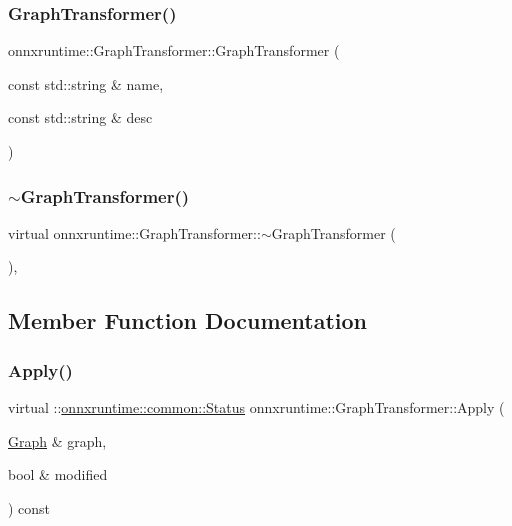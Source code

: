 \subsubsection{\texorpdfstring{Graph\+Transformer()}{GraphTransformer()}}
{\footnotesize\ttfamily onnxruntime\+::\+Graph\+Transformer\+::\+Graph\+Transformer (\begin{DoxyParamCaption}\item[{const std\+::string \&}]{name,  }\item[{const std\+::string \&}]{desc }\end{DoxyParamCaption})\hspace{0.3cm}{\ttfamily [inline]}}

\mbox{\label{classonnxruntime_1_1GraphTransformer_a17d436d4bb632f9a1d30b469946dd7ab}} 
\subsubsection{\texorpdfstring{$\sim$\+Graph\+Transformer()}{~GraphTransformer()}}
{\footnotesize\ttfamily virtual onnxruntime\+::\+Graph\+Transformer\+::$\sim$\+Graph\+Transformer (\begin{DoxyParamCaption}{ }\end{DoxyParamCaption})\hspace{0.3cm}{\ttfamily [virtual]}, {\ttfamily [default]}}



\subsection{Member Function Documentation}
\mbox{\label{classonnxruntime_1_1GraphTransformer_a690d351da797884409b1d7aa584e33b5}} 
\subsubsection{\texorpdfstring{Apply()}{Apply()}}
{\footnotesize\ttfamily virtual \+::\mbox{\hyperlink{classonnxruntime_1_1common_1_1Status}{onnxruntime\+::common\+::\+Status}} onnxruntime\+::\+Graph\+Transformer\+::\+Apply (\begin{DoxyParamCaption}\item[{\mbox{\hyperlink{classonnxruntime_1_1Graph}{Graph}} \&}]{graph,  }\item[{bool \&}]{modified }\end{DoxyParamCaption}) const\hspace{0.3cm}{\ttfamily [pure virtual]}}



